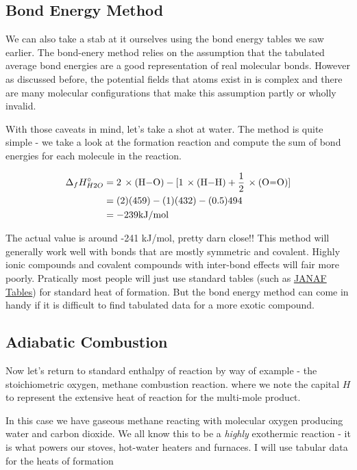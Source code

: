 \documentclass[twocolumn]{memoir} %
\makeatletter
\newcommand\reaction@[1]{\begin{equation}\ce{#1}\end{equation}}
\newcommand\reaction@nonumber[1]%
        {\begin{equation*}\ce{#1}\end{equation*}}
\newcommand\reaction{\@ifstar{\reaction@nonumber}{\reaction@}}
\makeatother
\begin{document}
\subsection{Bond Energy Method}
We can also take a stab at it ourselves using the bond energy tables we saw earlier.  The bond-enery 
method relies on the assumption that the tabulated average bond energies are a good representation
of real molecular bonds.  However as discussed before, the potential fields that atoms exist in is
complex and there are many molecular configurations that make this assumption partly or wholly invalid.

With those caveats in mind, let's take a shot at water.  The method is quite simple - we take a look at 
the formation reaction and compute the sum of bond energies for each molecule in the reaction.

\begin{equation}
    \begin{split}
        \Delta_f H_{H2O}^\circ &= \ce{2 \times (H-O) - [1 \times (H-H) + 1/2 \times (O=O)]}\\
        &= (2)(459) - (1)(432) - (0.5)494 \\
        &= -239 \text{kJ/mol}
    \end{split}
\end{equation}

The actual value is around -241 kJ/mol, pretty darn close!! This method will generally work well
with bonds that are mostly symmetric and covalent.  Highly ionic compounds and covalent compounds
with inter-bond effects will fair more poorly.  Pratically most people will just use standard
tables (such as \href{https://janaf.nist.gov/}{JANAF Tables}) for standard heat of formation.  But the bond energy method can come in
handy if it is difficult to find tabulated data for a more exotic compound.

\subsection{Adiabatic Combustion}

Now let's return to standard enthalpy of reaction by way of example - the stoichiometric oxygen, methane
combustion reaction.
%
\reaction{CH4(g) + 2O2(g) -> 2H2O(g) + CO2(g) + $\Delta H^\circ_{rxn}$}
%
where we note the capital $H$ to represent the extensive heat of reaction for the multi-mole product.

In this case we have gaseous methane reacting with molecular oxygen producing water and carbon dioxide.
We all know this to be a \emph{highly} exothermic reaction - it is what powers our stoves, hot-water
heaters and furnaces.  I will use tabular data for the heats of formation
%
\end{document}
